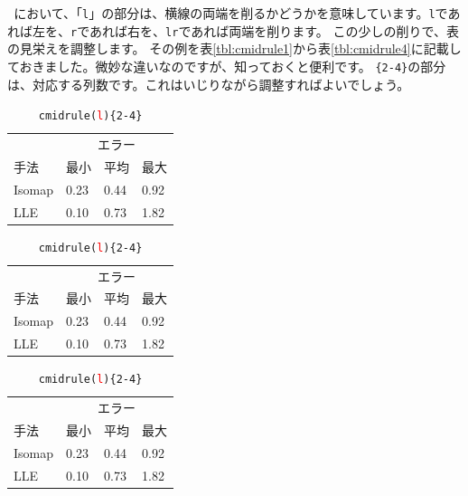 \documentclass[uplatex,onecolumn,9pt,dvipdfmx]{jsarticle}
\newcommand{\Tref}[1]{表\ref{#1}}
\begin{document}
\texttt{\cmidrule(l){2-4}}において、「\texttt{l}」の部分は、横線の両端を削るかどうかを意味しています。\texttt{l}であれば左を、\texttt{r}であれば右を、\texttt{lr}であれば両端を削ります。
この少しの削りで、表の見栄えを調整します。
その例を\Tref{tbl:cmidrule1}から\Tref{tbl:cmidrule4}に記載しておきました。微妙な違いなのですが、知っておくと便利です。
\texttt{\{2-4\}}の部分は、対応する列数です。これはいじりながら調整すればよいでしょう。

\begin{table}[h]
    \begin{minipage}[t]{0.24\linewidth}
        \centering
        \begin{tabular}{@{}llll@{}} \toprule
            & \multicolumn{3}{c}{エラー} \\ \cmidrule(){2-4}
            手法 & 最小 & 平均 & 最大     \\ \midrule
            Isomap & 0.23 & 0.44 & 0.92 \\
            LLE    & 0.10 & 0.73 & 1.82 \\ \bottomrule
        \end{tabular}
        \caption{\texttt{cmidrule()\{2-4\}}}
        \label{tbl:cmidrule1}
    \end{minipage}
    \hfill
    \begin{minipage}[t]{0.24\linewidth}
        \centering
        \begin{tabular}{@{}llll@{}} \toprule
            & \multicolumn{3}{c}{エラー} \\ \cmidrule(l){2-4}
            手法 & 最小 & 平均 & 最大     \\ \midrule
            Isomap & 0.23 & 0.44 & 0.92 \\
            LLE    & 0.10 & 0.73 & 1.82 \\ \bottomrule
        \end{tabular}
        \caption{\texttt{cmidrule(\textcolor{red}{l})\{2-4\}}}
        \label{tbl:cmidrule2}
    \end{minipage}
    \hfill
    \begin{minipage}[t]{0.24\linewidth}
        \centering
        \begin{tabular}{@{}llll@{}} \toprule
            & \multicolumn{3}{c}{エラー} \\ \cmidrule(r){2-4}
            手法 & 最小 & 平均 & 最大     \\ \midrule
            Isomap & 0.23 & 0.44 & 0.92 \\
            LLE    & 0.10 & 0.73 & 1.82 \\ \bottomrule

\end{tabular}
\end{minipage}
\end{table}
\end{document}
